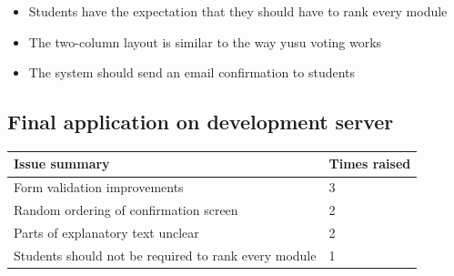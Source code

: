\documentclass[draft]{scrartcl}
\begin{document}
\begin{itemize}
  \item Students have the expectation that they should have to rank every module
  \item The two-column layout is similar to the way \gls{yusu} voting works
  \item The system should send an email confirmation to students
\end{itemize}

\subsection{Final application on development server}

\begin{tabular}{ | l | l | }
  \hline
  \textbf{Issue summary}                & \textbf{Times raised}  \\
  \hline
  Form validation improvements                         &    3    \\
  Random ordering of confirmation screen               &    2    \\
  Parts of explanatory text unclear                    &    2    \\
  Students should not be required to rank every module &    1    \\
  \hline
\end{tabular}



\clearpage
\printglossaries

\clearpage

\end{document}

